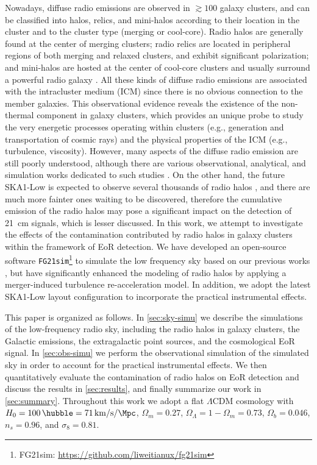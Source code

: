 \documentclass[modern]{aastex61}
\newcommand{\lcdm}{$\Lambda$CDM}
\begin{document}
Nowadays, diffuse radio emissions are observed in $\gtrsim 100$ galaxy
clusters, and can be classified into halos, relics, and mini-halos
according to their location in the cluster and to the cluster type
(merging or cool-core).
Radio halos are generally found at the center of merging clusters;
radio relics are located in peripheral regions of both merging and
relaxed clusters, and exhibit significant polarization;
and mini-halos are hosted at the center of cool-core clusters and
usually surround a powerful radio galaxy \citep{feretti2012rev}.
All these kinds of diffuse radio emissions are associated with the
intracluster medium (ICM) since there is no obvious connection to
the member galaxies.
This observational evidence reveals the existence of the non-thermal
component in galaxy clusters, which provides an unique probe to study
the very energetic processes operating within clusters (e.g., generation
and transportation of cosmic rays)
and the physical properties of the ICM (e.g., turbulence, viscosity).
However, many aspects of the diffuse radio emission are still poorly
understood, although there are various observational, analytical, and
simulation works dedicated to such studies
\citep[see][for a recent review]{brunetti2014rev}.
On the other hand, the future SKA1-Low is expected to observe several
thousands of radio halos \citep{cassano2015}, and there are much more
fainter ones waiting to be discovered, therefore the cumulative emission
of the radio halos may pose a significant impact on the detection of
21~cm signals, which is lesser discussed.
In this work, we attempt to investigate the effects of the contamination
contributed by radio halos in galaxy clusters within the framework of
EoR detection.
We have developed an open-source software
\texttt{FG21sim}\footnote{FG21sim: \url{https://github.com/liweitianux/fg21sim}}
to simulate the low frequency sky based on our previous works
\citep{wang2010,wang2013}, but have significantly enhanced the modeling
of radio halos by applying a merger-induced turbulence re-acceleration model.
In addition, we adopt the latest SKA1-Low layout configuration to
incorporate the practical instrumental effects.

This paper is organized as follows.
In \autoref{sec:sky-simu} we describe the simulations of the low-frequency
radio sky, including the radio halos in galaxy clusters, the Galactic
emissions, the extragalactic point sources, and the cosmological EoR signal.
In \autoref{sec:obs-simu} we perform the observational simulation of the
simulated sky in order to account for the practical instrumental effects.
We then quantitatively evaluate the contamination of radio halos on EoR
detection and discuss the results in \autoref{sec:results},
and finally summarize our work in \autoref{sec:summary}.
Throughout this work we adopt a flat \lcdm{} cosmology with
$H_0 = \SI{100}{\hubble} = \SI{71}{\km\per\second\per\Mpc}$,
$\Omega_m = 0.27$, $\Omega_{\Lambda} = 1 - \Omega_m = 0.73$,
$\Omega_b = 0.046$, $n_s = 0.96$, and $\sigma_8 = 0.81$.
\end{document}
